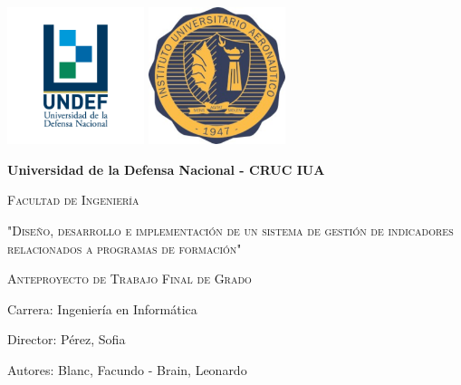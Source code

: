 \begin{titlepage}
	\centering
	\includegraphics[width=0.3\textwidth]{imagenes/undef}
	\includegraphics[width=0.3\textwidth]{imagenes/iua}\\
	\vspace{1cm}
	{\bfseries\LARGE Universidad de la Defensa Nacional - CRUC IUA \par}
	\vspace{1cm}
	{\scshape\Large Facultad de Ingenier\'ia \par}
	\vspace{2cm}
	{\scshape\Large "Diseño, desarrollo e implementación de un sistema de gestión de indicadores relacionados a programas de formación" \par}
	\vspace{1cm}
	{\scshape\Large Anteproyecto de Trabajo Final de Grado \par}
	\begin{flushleft}
	\vfill
	\vspace{0.5cm}
	{\Large Carrera: Ingeniería en Informática\par}
	\vspace{0.5cm}
	{\Large Director: Pérez, Sofia\par}
	\vspace{0.5cm}
	{\Large Autores: Blanc, Facundo - Brain, Leonardo\par}
	\vfill
	\end{flushleft}
\end{titlepage}